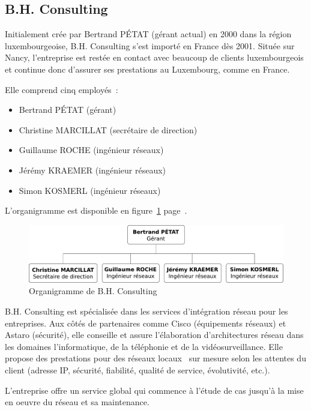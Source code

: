 \subsection{B.H. Consulting}

Initialement crée par Bertrand PÉTAT (gérant actual) en 2000 dans la région luxembourgeoise, B.H. Consulting s'est importé en France dès 2001. Située sur Nancy, l'entreprise est restée en contact avec beaucoup de clients luxembourgeois et continue donc d'assurer ses prestations au Luxembourg, comme en France.

Elle comprend cinq employés~:

\begin{itemize}
\item Bertrand PÉTAT (gérant)
\item Christine MARCILLAT (secrétaire de direction)
\item Guillaume ROCHE (ingénieur réseaux)
\item Jérémy KRAEMER (ingénieur réseaux)
\item Simon KOSMERL (ingénieur réseaux)
\end{itemize}

L'organigramme est disponible en figure~\ref{organigramme} page~\pageref{organigramme}.

\begin{figure}[!h]
	\label{organigramme}
	\begin{center}
		\includegraphics[width=\textwidth]{img/organigramme.pdf}
	\end{center}
	\caption{Organigramme de B.H. Consulting}
\end{figure}

B.H. Consulting est spécialisée dans les services d'intégration réseau pour les entreprises. Aux côtés de partenaires comme Cisco (équipements réseaux) et Astaro (sécurité), elle conseille et assure l'élaboration d'architectures réseau dans les domaines l'informatique, de la téléphonie et de la vidéosurveillance. Elle propose des prestations pour des réseaux locaux \og~sur mesure\fg{} selon les attentes du client (adresse IP, sécurité, fiabilité, qualité de service, évolutivité, etc.).

L’entreprise offre un service global qui commence à l’étude de cas jusqu’à la mise en oeuvre du réseau et sa maintenance.

